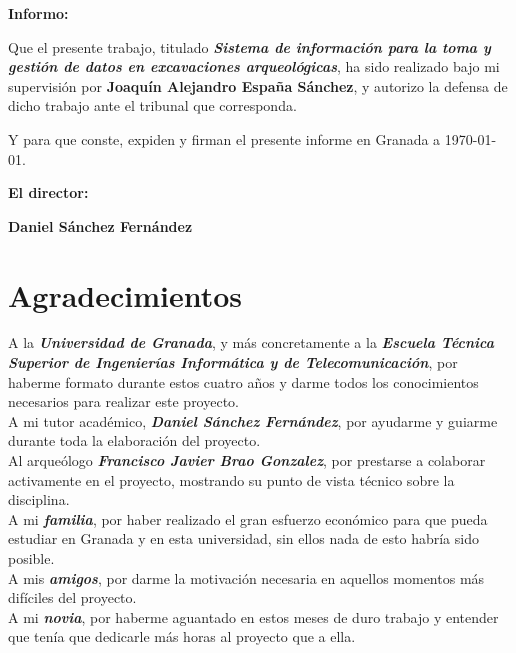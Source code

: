 \vspace{0.5cm}

\textbf{Informo:}

\vspace{0.5cm}

Que el presente trabajo, titulado \textit{\textbf{Sistema de información para la toma y
gestión de datos en excavaciones arqueológicas}}, ha sido realizado bajo mi supervisión por
\textbf{Joaquín Alejandro España Sánchez}, y autorizo la defensa de dicho trabajo ante el
tribunal que corresponda.

\vspace{0.5cm}

Y para que conste, expiden y firman el presente informe en Granada a \today.

\vspace{1cm}

\textbf{El director:}

\vspace{5cm}

\noindent \textbf{Daniel Sánchez Fernández}

\chapter*{Agradecimientos}

A la \textbf{\textit{Universidad de Granada}}, y más concretamente a la \textbf{\textit{Escuela
Técnica Superior de Ingenierías Informática y de Telecomunicación}}, por haberme formato
durante estos cuatro años y darme todos los conocimientos necesarios para realizar este
proyecto. \\

A mi tutor académico, \textbf{\textit{Daniel Sánchez Fernández}}, por ayudarme y guiarme durante
toda la elaboración del proyecto. \\

Al arqueólogo \textbf{\textit{Francisco Javier Brao Gonzalez}}, por prestarse a colaborar
activamente en el proyecto, mostrando su punto de vista técnico sobre la disciplina. \\

A mi \textbf{\textit{familia}}, por haber realizado el gran esfuerzo económico para que pueda
estudiar en Granada y en esta universidad, sin ellos nada de esto habría sido posible. \\

A mis \textbf{\textit{amigos}}, por darme la motivación necesaria en aquellos momentos más
difíciles del proyecto. \\

A mi \textbf{\textit{novia}}, por haberme aguantado en estos meses de duro trabajo y entender
que tenía que dedicarle más horas al proyecto que a ella. \\
